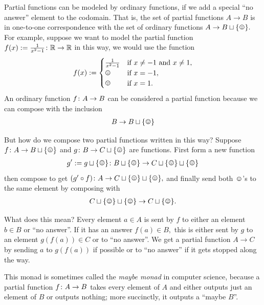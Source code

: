 \documentclass[../main/CT4S-EN-RU]{subfiles}
\begin{document}
\begin{blockRUS}
\end{blockRUS}

\begin{exampleENG}\label{ex:partial function monad}
Partial functions can be modeled by ordinary functions, if we add a special “no answer” element to the codomain. That is, the set of partial functions $A\to B$ is in one-to-one correspondence with the set of ordinary functions $A\to B\sqcup\singleton.$ For example, suppose we want to model the partial function $f(x):=\frac{1}{x^2-1}\colon{\mathbb R}\rightarrow{\mathbb R}$ in this way, we would use the function 
$$f(x):=\begin{cases}
\frac{1}{x^2-1}&\tn{if } x\neq -1 \tn{ and } x\neq 1,\\
\smiley&\tn{if } x=-1,\\
\smiley&\tn{if } x= 1.
\end{cases}
$$
An ordinary function $f\colon A\rightarrow B$ can be considered a partial function because we can compose with the inclusion 
\begin{align}\label{dia:first eta}
B\to B\sqcup\singleton
\end{align}

But how do we compose two partial functions written in this way? Suppose $f\taking A\to B\sqcup\singleton$ and $g\taking B\to C\sqcup\singleton$ are functions. First form a new function 
\begin{align}\label{dia:first monad}
g':=g\sqcup\singleton\taking B\sqcup\singleton\to C\sqcup\singleton\sqcup\singleton
\end{align}
then compose to get $(g'\circ f)\taking A\to C\sqcup\singleton\sqcup\singleton,$ and finally send both $\smiley$'s to the same element by composing with 
\begin{align}\label{dia:first mu}
C\sqcup\singleton\sqcup\singleton\to C\sqcup\singleton.
\end{align}

What does this mean? Every element $a\in A$ is sent by $f$ to either an element $b\in B$ or “no answer”. If it has an answer $f(a)\in B,$ this is either sent by $g$ to an element $g(f(a))\in C$ or to “no answer”. We get a partial function $A\to C$ by sending $a$ to $g(f(a))$ if possible or to “no answer” if it gets stopped along the way.

This monad is sometimes called the {\em maybe monad} in computer science, because a partial function $f\colon A\rightarrow B$ takes every element of $A$ and either outputs just an element of $B$ or outputs nothing; more succinctly, it outputs a “maybe $B$”.
\end{exampleENG}
\end{document}
